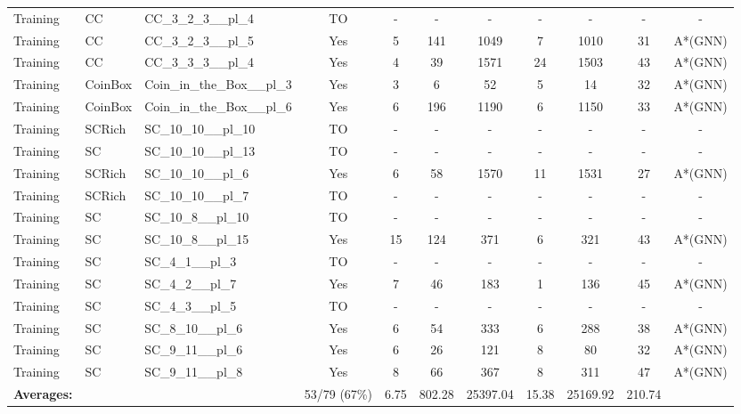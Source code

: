\documentclass{article}
\begin{document}
\begin{tabular}{lllcccccccc}
Training & CC & CC\_3\_2\_3\_\_pl\_4 & TO & - & - & - & - & - & - & - \\
Training & CC & CC\_3\_2\_3\_\_pl\_5 & Yes & 5 & 141 & 1049 & 7 & 1010 & 31 & A*(GNN) \\
Training & CC & CC\_3\_3\_3\_\_pl\_4 & Yes & 4 & 39 & 1571 & 24 & 1503 & 43 & A*(GNN) \\
Training & CoinBox & Coin\_in\_the\_Box\_\_pl\_3 & Yes & 3 & 6 & 52 & 5 & 14 & 32 & A*(GNN) \\
Training & CoinBox & Coin\_in\_the\_Box\_\_pl\_6 & Yes & 6 & 196 & 1190 & 6 & 1150 & 33 & A*(GNN) \\
Training & SCRich & SC\_10\_10\_\_pl\_10 & TO & - & - & - & - & - & - & - \\
Training & SC & SC\_10\_10\_\_pl\_13 & TO & - & - & - & - & - & - & - \\
Training & SCRich & SC\_10\_10\_\_pl\_6 & Yes & 6 & 58 & 1570 & 11 & 1531 & 27 & A*(GNN) \\
Training & SCRich & SC\_10\_10\_\_pl\_7 & TO & - & - & - & - & - & - & - \\
Training & SC & SC\_10\_8\_\_pl\_10 & TO & - & - & - & - & - & - & - \\
Training & SC & SC\_10\_8\_\_pl\_15 & Yes & 15 & 124 & 371 & 6 & 321 & 43 & A*(GNN) \\
Training & SC & SC\_4\_1\_\_pl\_3 & TO & - & - & - & - & - & - & - \\
Training & SC & SC\_4\_2\_\_pl\_7 & Yes & 7 & 46 & 183 & 1 & 136 & 45 & A*(GNN) \\
Training & SC & SC\_4\_3\_\_pl\_5 & TO & - & - & - & - & - & - & - \\
Training & SC & SC\_8\_10\_\_pl\_6 & Yes & 6 & 54 & 333 & 6 & 288 & 38 & A*(GNN) \\
Training & SC & SC\_9\_11\_\_pl\_6 & Yes & 6 & 26 & 121 & 8 & 80 & 32 & A*(GNN) \\
Training & SC & SC\_9\_11\_\_pl\_8 & Yes & 8 & 66 & 367 & 8 & 311 & 47 & A*(GNN) \\
\textbf{Averages:} & & & 53/79 (67\%) & 6.75 & 802.28 & 25397.04 & 15.38 & 25169.92 & 210.74 & \\
\bottomrule
\end{tabular}
\newpage
\end{document}
